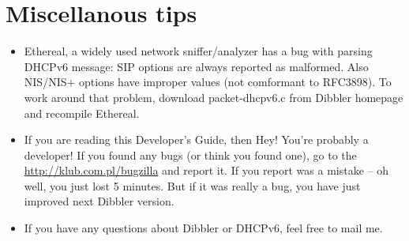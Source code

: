 
\section{Miscellanous tips}

\begin{itemize}
\item Ethereal, a widely used network sniffer/analyzer has a bug with
  parsing DHCPv6 message: SIP options are always reported as
  malformed. Also NIS/NIS+ options have improper values (not
  comformant to RFC3898). To work around that problem, download
  packet-dhcpv6.c from Dibbler homepage and recompile Ethereal.
\item If you are reading this Developer's Guide, then Hey! You're
  probably a developer! If you found any bugs (or think you found
  one), go to the
  \href{http://klub.com.pl/bugzilla}{http://klub.com.pl/bugzilla}
   and report it. If you report was a mistake -- oh well, you just
  lost 5 minutes. But if it was really a bug, you have just improved
  next Dibbler version.
\item If you have any questions about Dibbler or DHCPv6, feel free to
  mail me.
\end{itemize}

